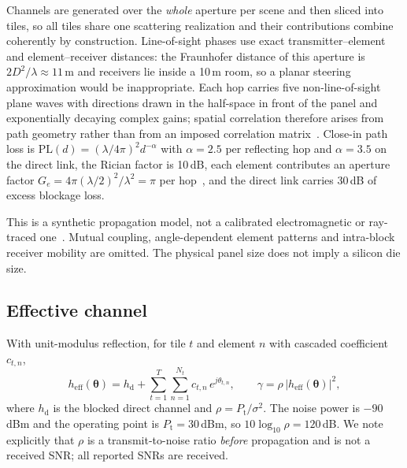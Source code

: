 \documentclass[journal]{IEEEtran}
\newcommand{\dB}{\,dB\xspace}
\begin{document}
Channels are generated over the \emph{whole} aperture per scene and then sliced into tiles, so all tiles share one scattering realization and their contributions combine coherently by construction. Line-of-sight phases use exact transmitter--element and element--receiver distances: the Fraunhofer distance of this aperture is $2D^2/\lambda\approx11$\,m and receivers lie inside a 10\,m room, so a planar steering approximation would be inappropriate. Each hop carries five non-line-of-sight plane waves with directions drawn in the half-space in front of the panel and exponentially decaying complex gains; spatial correlation therefore arises from path geometry rather than from an imposed correlation matrix~\cite{bjornson2021rayleigh}. Close-in path loss is $\mathrm{PL}(d)=(\lambda/4\pi)^2 d^{-\alpha}$ with $\alpha=2.5$ per reflecting hop and $\alpha=3.5$ on the direct link, the Rician factor is 10\dB, each element contributes an aperture factor $G_e=4\pi(\lambda/2)^2/\lambda^2=\pi$ per hop~\cite{tang2021}, and the direct link carries 30\dB of excess blockage loss.

This is a synthetic propagation model, not a calibrated electromagnetic or ray-traced one~\cite{alkhateeb2019}. Mutual coupling, angle-dependent element patterns and intra-block receiver mobility are omitted. The physical panel size does not imply a silicon die size.

\subsection{Effective channel}
With unit-modulus reflection, for tile $t$ and element $n$ with cascaded coefficient $c_{t,n}$,
\begin{equation}
h_{\mathrm{eff}}(\bm{\theta}) = h_{\mathrm{d}} + \sum_{t=1}^{T}\sum_{n=1}^{N_t} c_{t,n}\,e^{j\theta_{t,n}},
\qquad
\gamma = \rho\,\bigl|h_{\mathrm{eff}}(\bm{\theta})\bigr|^{2},
\label{eq:heff}
\end{equation}
where $h_{\mathrm{d}}$ is the blocked direct channel and $\rho=P_{\mathrm{t}}/\sigma^2$. The noise power is $-90$\,dBm and the operating point is $P_{\mathrm{t}}=30$\,dBm, so $10\log_{10}\rho=120$\dB. We note explicitly that $\rho$ is a transmit-to-noise ratio \emph{before} propagation and is not a received SNR; all reported SNRs are received.
\end{document}
